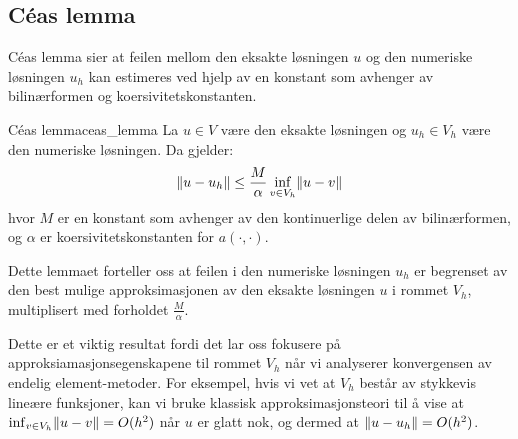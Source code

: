 \subsection{Céas lemma}
Céas lemma sier at feilen mellom den eksakte løsningen $u$ og den numeriske løsningen $u_h$ kan estimeres ved hjelp av en konstant som avhenger av bilinærformen og koersivitetskonstanten.

\begin{lemma}{Céas lemma}{ceas_lemma}
	La $u \in V$ være den eksakte løsningen og $u_h \in V_h$ være den numeriske løsningen. Da gjelder:
	\[
		\norm*{u - u_h} \leq \frac{M}{\alpha} \inf_{v \in V_h} \norm*{u - v}
	\]
	hvor $M$ er en konstant som avhenger av den kontinuerlige delen av bilinærformen, og $\alpha$ er koersivitetskonstanten for $a(\cdot,\cdot)$.
\end{lemma}

Dette lemmaet forteller oss at feilen i den numeriske løsningen $u_h$ er begrenset av den best mulige approksimasjonen av den eksakte løsningen $u$ i rommet $V_h$, multiplisert med forholdet $\frac{M}{\alpha}$.

Dette er et viktig resultat fordi det lar oss fokusere på approksiamasjonsegenskapene til rommet $V_h$ når vi analyserer konvergensen av endelig element-metoder. For eksempel, hvis vi vet at $V_h$ består av stykkevis lineære funksjoner, kan vi bruke klassisk approksimasjonsteori til å vise at $\inf_{v \in V_h} \norm*{u - v} = O(h^2)$ når $u$ er glatt nok, og dermed at $\norm*{u - u_h} = O(h^2)$.



